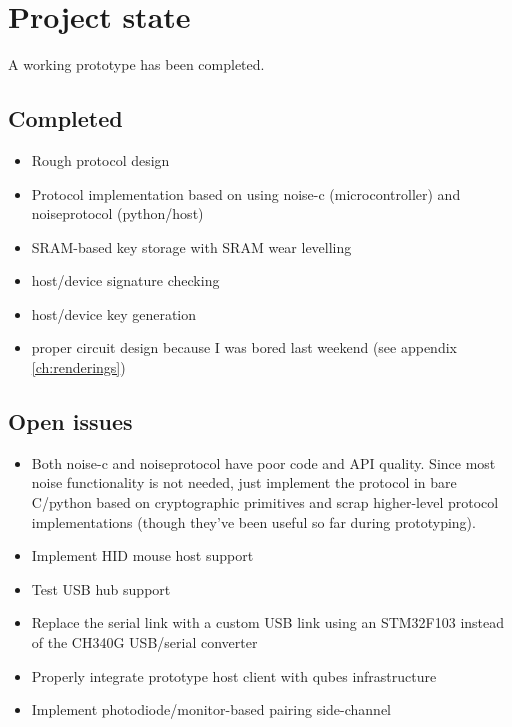 \documentclass[12pt,a4paper,notitlepage]{article}
\begin{document}
\nocite{*}
\printbibliography

\appendix
\section{Project state}
A working prototype has been completed.

\subsection{Completed}
\begin{itemize}
    \item Rough protocol design
    \item Protocol implementation based on \textcite{perrin01} using noise-c (microcontroller) and noiseprotocol (python/host)
    \item SRAM-based key storage with SRAM wear levelling
    \item host/device signature checking
    \item host/device key generation
    \item proper circuit design because I was bored last weekend (see appendix \ref{ch:renderings})
\end{itemize}

\subsection{Open issues}
\begin{itemize}
    \item Both noise-c and noiseprotocol have poor code and API quality. Since most noise functionality is not needed,
        just implement the protocol in bare C/python based on cryptographic primitives and scrap higher-level protocol
        implementations (though they've been useful so far during prototyping).
    \item Implement HID mouse host support
    \item Test USB hub support
    \item Replace the serial link with a custom USB link using an STM32F103 instead of the CH340G USB/serial converter
    \item Properly integrate prototype host client with qubes infrastructure
    \item Implement photodiode/monitor-based pairing side-channel
\end{itemize}
\end{document}
